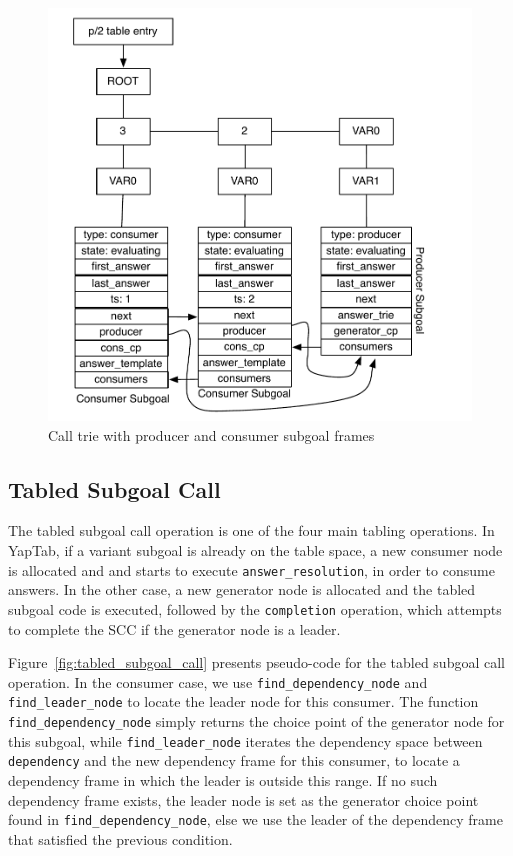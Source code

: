 \begin{figure}[H]
  \centering
    \includegraphics[scale=0.6]{subgoal_frames.pdf}
  \caption{Call trie with producer and consumer subgoal frames}
  \label{fig:subgoal_frames}
\end{figure}

\subsection{Tabled Subgoal Call}

The tabled subgoal call operation is one of the four main tabling operations. In YapTab,
if a variant subgoal is already on the table space, a new consumer node is allocated and
and starts to execute \texttt{answer\_resolution}, in order to consume answers. In
the other case, a new generator node is allocated and the tabled subgoal code is executed,
followed by the \texttt{completion} operation, which attempts to complete the SCC if the
generator node is a leader.

Figure~\ref{fig:tabled_subgoal_call} presents pseudo-code for the tabled subgoal call operation.
In the consumer case, we use \texttt{find\_dependency\_node} and \texttt{find\_leader\_node}
to locate the leader node for this consumer. The function \texttt{find\_dependency\_node} simply
returns the choice point of the generator node for this subgoal, while \texttt{find\_leader\_node}
iterates the dependency space between \texttt{dependency} and the new dependency frame for this consumer,
to locate a dependency frame in which the leader is outside this range. If no such dependency frame
exists, the leader node is set as the generator choice point found in \texttt{find\_dependency\_node},
else we use the leader of the dependency frame that satisfied the previous condition. 

